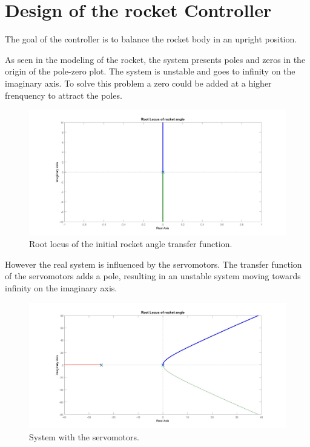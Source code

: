 \graphicspath{{figures/Design/IPController/}}

\chapter{Design of the rocket Controller}\label{sec:IPController}
The goal of the controller is to balance the rocket body in an upright position. 

As seen in the modeling of the rocket, the system presents poles and zeros in the origin of the pole-zero plot. The system is unstable and goes to infinity on the imaginary axis. To solve this problem a zero could be added at a higher frenquency to attract the poles.

\begin{figure}[htbp]
	\centering
	
		\includegraphics[width=\textwidth]{figures/Rocket/design/initial_transfer_function_vf}
		\caption{Root locus of the initial rocket angle transfer function.}
		\label{fig:Rinitialtf}
	
\end{figure}

However the real system is influenced by the servomotors. The transfer function of the servomotors adds a pole, resulting in an unstable system moving towards infinity on the imaginary axis. 
				
\begin{figure}[htbp]
	\centering
		\includegraphics[width=\textwidth]{figures/Rocket/design/tf_with_servo_vf}
		\caption{System with the servomotors.}
		\label{fig:SystemServo}
\end{figure}

